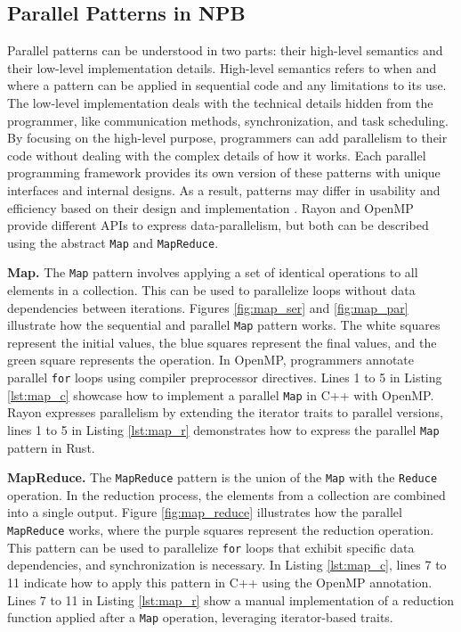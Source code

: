     \subsection{Parallel Patterns in NPB}\label{sec:par_back}
    Parallel patterns can be understood in two parts: their high-level semantics and their low-level implementation details. High-level semantics refers to when and where a pattern can be applied in sequential code and any limitations to its use. The low-level implementation deals with the technical details hidden from the programmer, like communication methods, synchronization, and task scheduling. By focusing on the high-level purpose, programmers can add parallelism to their code without dealing with the complex details of how it works. Each parallel programming framework provides its own version of these patterns with unique interfaces and internal designs. As a result, patterns may differ in usability and efficiency based on their design and implementation \cite{NPB-CPP-2021}. Rayon and OpenMP provide different APIs to express data-parallelism, but both can be described using the abstract \texttt{Map} and \texttt{MapReduce}.

    \textbf{Map.} The \texttt{Map} pattern \cite{map} involves applying a set of identical operations to all elements in a collection. This can be used to parallelize loops without data dependencies between iterations. Figures \ref{fig:map_ser} and \ref{fig:map_par} illustrate how the sequential and parallel \texttt{Map} pattern works. The white squares represent the initial values, the blue squares represent the final values, and the green square represents the operation. In OpenMP, programmers annotate parallel \texttt{for} loops using compiler preprocessor directives. Lines 1 to 5 in Listing \ref{lst:map_c} showcase how to implement a parallel \texttt{Map} in C++ with OpenMP. Rayon expresses parallelism by extending the iterator traits to parallel versions, lines 1 to 5 in Listing \ref{lst:map_r} demonstrates how to express the parallel \texttt{Map} pattern in Rust.

    \textbf{MapReduce.} The \texttt{MapReduce} pattern \cite{map} is the union of the \texttt{Map} with the \texttt{Reduce} operation. In the reduction process, the elements from a collection are combined into a single output. Figure \ref{fig:map_reduce} illustrates how the parallel \texttt{MapReduce} works, where the purple squares represent the reduction operation. This pattern can be used to parallelize \texttt{for} loops that exhibit specific data dependencies, and synchronization is necessary. In Listing \ref{lst:map_c}, lines 7 to 11 indicate how to apply this pattern in C++ using the OpenMP annotation. Lines 7 to 11 in Listing \ref{lst:map_r} show a manual implementation of a reduction function applied after a \texttt{Map} operation, leveraging iterator-based traits.

